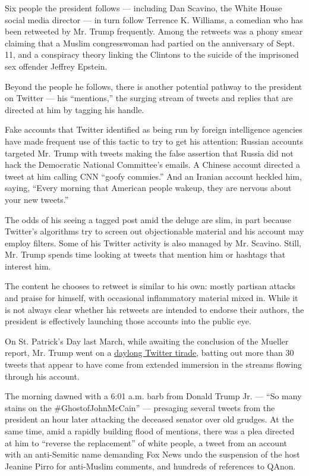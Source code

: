 Six people the president follows --- including Dan Scavino, the White
House social media director --- in turn follow Terrence K. Williams, a
comedian who has been retweeted by Mr. Trump frequently. Among the
retweets was a phony smear claiming that a Muslim congresswoman had
partied on the anniversary of Sept. 11, and a conspiracy theory linking
the Clintons to the suicide of the imprisoned sex offender Jeffrey
Epstein.

Beyond the people he follows, there is another potential pathway to the
president on Twitter --- his ``mentions,'' the surging stream of tweets
and replies that are directed at him by tagging his handle.

Fake accounts that Twitter identified as being run by foreign
intelligence agencies have made frequent use of this tactic to try to
get his attention: Russian accounts targeted Mr. Trump with tweets
making the false assertion that Russia did not hack the Democratic
National Committee's emails. A Chinese account directed a tweet at him
calling CNN ``goofy commies.'' And an Iranian account heckled him,
saying, ``Every morning that American people wakeup, they are nervous
about your new tweets.''

The odds of his seeing a tagged post amid the deluge are slim, in part
because Twitter's algorithms try to screen out objectionable material
and his account may employ filters. Some of his Twitter activity is also
managed by Mr. Scavino. Still, Mr. Trump spends time looking at tweets
that mention him or hashtags that interest him.

The content he chooses to retweet is similar to his own: mostly partisan
attacks and praise for himself, with occasional inflammatory material
mixed in. While it is not always clear whether his retweets are intended
to endorse their authors, the president is effectively launching those
accounts into the public eye.

On St. Patrick's Day last March, while awaiting the conclusion of the
Mueller report, Mr. Trump went on a
\href{https://www.washingtonpost.com/politics/fifty-two-tweets-in-34-hours-how-a-trump-twitter-frenzy-defined-a-weekend/2019/03/23/3bed256c-4bf0-11e9-93d0-64dbcf38ba41_story.html}{daylong
Twitter tirade}, batting out more than 30 tweets that appear to have
come from extended immersion in the streams flowing through his account.

The morning dawned with a 6:01 a.m. barb from Donald Trump Jr. --- ``So
many stains on the \#GhostofJohnMcCain'' --- presaging several tweets
from the president an hour later attacking the deceased senator over old
grudges. At the same time, amid a rapidly building flood of mentions,
there was a plea directed at him to ``reverse the replacement'' of white
people, a tweet from an account with an anti-Semitic name demanding Fox
News undo the suspension of the host Jeanine Pirro for anti-Muslim
comments, and hundreds of references to QAnon.

